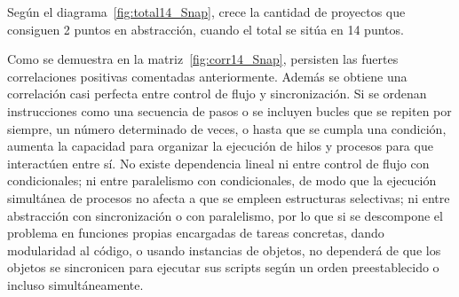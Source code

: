 \documentclass[a4paper, 12pt]{book}
\begin{document}
Según el diagrama~\ref{fig:total14_Snap}, crece la cantidad de proyectos que consiguen 2 puntos en abstracción, cuando el total se sitúa en 14 puntos.

Como se demuestra en la matriz~\ref{fig:corr14_Snap}, persisten las fuertes correlaciones positivas comentadas anteriormente. Además se obtiene una correlación casi perfecta entre control de flujo y sincronización. Si se ordenan instrucciones como una secuencia de pasos o se incluyen bucles que se repiten por siempre, un número determinado de veces, o hasta que se cumpla una condición, aumenta la capacidad para organizar la ejecución de hilos y procesos para que interactúen entre sí. No existe dependencia lineal ni entre control de flujo con condicionales; ni entre paralelismo con condicionales, de modo que la ejecución simultánea de procesos no afecta a que se empleen estructuras selectivas; ni entre abstracción con sincronización o con paralelismo, por lo que si se descompone el problema en funciones propias encargadas de tareas concretas, dando modularidad al código, o usando instancias de objetos, no dependerá de que los objetos se sincronicen para ejecutar sus scripts según un orden preestablecido o incluso simultáneamente.
\end{document}
